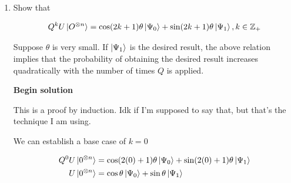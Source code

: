 \documentclass[11pt]{article}
\newcommand{\sinth}{\sin\theta}
\newcommand{\costh}{\cos\theta}
\newcommand{\ztimesn}{0^{\otimes n}}
\begin{document}
\begin{enumerate}
\begin{enumerate}
		            \begin{align*}
			            US_{i}U^{-1}S_{1}\ket{\Psi_0} & = -\costh\ket{\ztimesn} - \sinth\ket{\phi}                                                                  \\
			                                          & = -\costh(\costh\ket{\Psi_0} + \sinth\ket{\Psi_1}) - \sinth(-\sinth\ket{\Psi_0} + \costh\ket{\Psi_1})       \\
			                                          & = -\cos^2\theta\ket{\Psi_0} - \sinth\costh\ket{\Psi_1} + \sin^2\theta\ket{Psi_0} - \sinth\costh\ket{\Psi_1} \\
			                                          & = \sin^2\theta\ket{\Psi_0} - \cos^2\theta\ket{\Psi_0} - 2\sinth\costh\ket{\Psi_1}
		            \end{align*}

		            Apply ``$-$'' operator

		            \begin{align*}
			             & = \cos^2\theta\ket{\Psi_0} - \sin^2\theta\ket{\Psi_0} + 2\sinth\costh\ket{\Psi_1} \\
			             & = \cos(2\theta)\ket{\Psi_0} + \sin(2\theta)\ket{\Psi_1}
		            \end{align*}

		            Which is equal to $Q$ defined above.

		      \item Show that

		            \begin{equation*}
			            Q^k U\ket{O^{\otimes n}} = \cos(2k + 1)\theta \ket{\Psi_0} + \sin(2k+1)\theta\ket{\Psi_1}, k \in \mathbb{Z}_+
		            \end{equation*}

		            Suppose $\theta$ is very small. If $\ket{\Psi_1}$ is the desired result, the above relation implies that the probability of obtaining the desired result increases quadratically with the number of times $Q$ is applied.

		            \textbf{Begin solution}

		            This is a proof by induction. Idk if I'm supposed to say that, but that's the technique I am using.

		            We can establish a base case of $k=0$

		            \begin{align*}
			            Q^0U\ket{\ztimesn} & = \cos(2(0) + 1)\theta\ket{\Psi_0} + \sin(2(0)+1)\theta\ket{\Psi_1} \\
			            U\ket{\ztimesn}    & =  \costh\ket{\Psi_0} + \sinth\ket{\Psi_1}
		            \end{align*}


\end{enumerate}
\end{enumerate}
\end{document}
